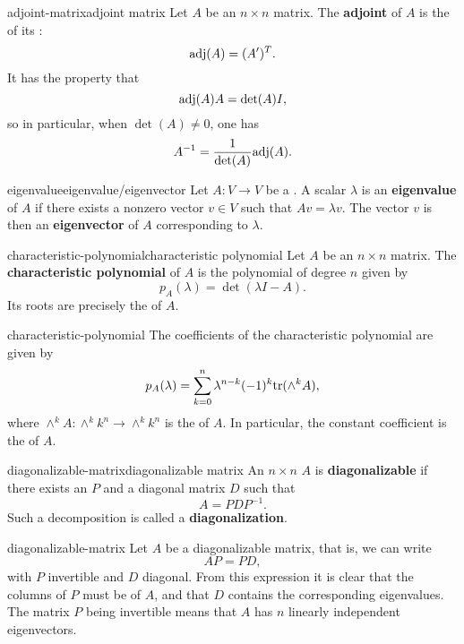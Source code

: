 \begin{topic}{adjoint-matrix}{adjoint matrix}
    Let $A$ be an $n \times n$ matrix. The \textbf{adjoint} of $A$ is the  of its :
    \[ \textup{adj}(A) = (A')^T . \]
    It has the property that
    \[ \textup{adj}(A) A = \det(A) I , \]
    so in particular, when $\det(A) \ne 0$, one has
    \[ A^{-1} = \frac{1}{\det(A)} \textup{adj}(A) . \]
\end{topic}

\begin{topic}{eigenvalue}{eigenvalue/eigenvector}
    Let $A \colon V \to V$ be a . A scalar $\lambda$ is an \textbf{eigenvalue} of $A$ if there exists a nonzero vector $v \in V$ such that $A v = \lambda v$. The vector $v$ is then an \textbf{eigenvector} of $A$ corresponding to $\lambda$.
\end{topic}

\begin{topic}{characteristic-polynomial}{characteristic polynomial}
    Let $A$ be an $n \times n$ matrix. The \textbf{characteristic polynomial} of $A$ is the polynomial of degree $n$ given by
    \[ p_A(\lambda) = \det(\lambda I - A) . \]
    Its roots are precisely the  of $A$.
\end{topic}

\begin{example}{characteristic-polynomial}
    The coefficients of the characteristic polynomial are given by
    \[ p_A(\lambda) = \sum_{k = 0}^{n} \lambda^{n - k} (-1)^k \textup{tr}(\wedge^k A) , \]
    where $\wedge^k A \colon \wedge^k k^n \to \wedge^k k^n$ is the  of $A$.
    In particular, the constant coefficient is the  of $A$.
\end{example}

\begin{topic}{diagonalizable-matrix}{diagonalizable matrix}
    An $n \times n$  $A$ is \textbf{diagonalizable} if there exists an  $P$ and a diagonal matrix $D$ such that
    \[ A = P D P^{-1} . \]
    Such a decomposition is called a \textbf{diagonalization}.
\end{topic}

\begin{example}{diagonalizable-matrix}
    Let $A$ be a diagonalizable matrix, that is, we can write
    \[ A P = P D , \]
    with $P$ invertible and $D$ diagonal. From this expression it is clear that the columns of $P$ must be  of $A$, and that $D$ contains the corresponding eigenvalues. The matrix $P$ being invertible means that $A$ has $n$ linearly independent eigenvectors.
\end{example}

